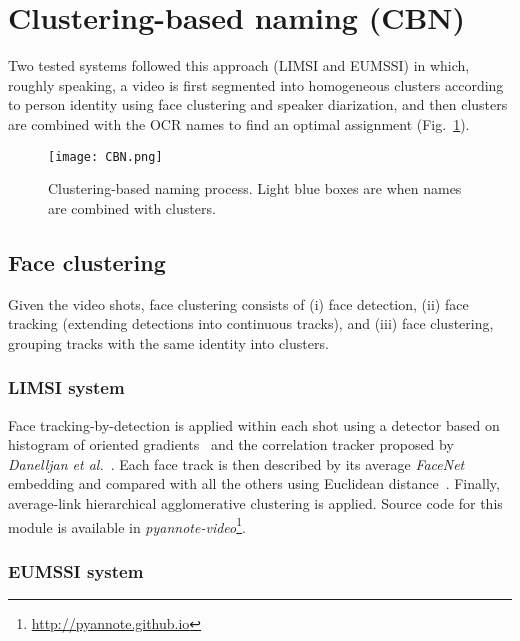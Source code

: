 \section{Clustering-based naming (CBN)}
\label{sec:clustering}

Two tested systems followed this approach (LIMSI and EUMSSI)  in which, roughly speaking, 
a video is first segmented into homogeneous clusters according to person identity using face clustering and speaker diarization, 
and then clusters are combined with the OCR names to find an optimal assignment (Fig.~\ref{fig:cbn}).

\begin{figure}[tb]
 \centering
 \texttt{[image: CBN.png]}
\vspace*{-8mm}
 \caption{Clustering-based naming process. Light blue boxes are when names are combined with clusters.}
\vspace*{-3mm}
 \label{fig:cbn}
\end{figure}

\subsection{Face clustering}

Given the video shots, face clustering consists of (i) face detection, 
(ii) face tracking (extending detections into continuous tracks), 
and (iii) face clustering, grouping tracks with the same identity into clusters.

\subsubsection{LIMSI system}

Face tracking-by-detection is applied within each shot using a detector based on histogram of oriented gradients~\cite{Dalal2005} and the correlation tracker proposed by \emph{Danelljan et al.}~\cite{Danelljan2014}. 
%
Each face track is then described by its average \emph{FaceNet} embedding and compared with all the others using Euclidean distance~\cite{Schroff2015}. 
%
Finally, average-link hierarchical agglomerative clustering is applied. Source code for this module is available in \emph{pyannote-video}\footnote{\url{http://pyannote.github.io}}.

\subsubsection{EUMSSI system}

